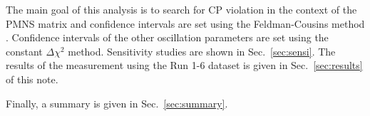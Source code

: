 The main goal of this analysis is to search for CP violation in the context of the PMNS matrix
and confidence intervals are set using the Feldman-Cousins method \cite{FeldmanCousins}.
Confidence intervals of the other oscillation parameters are set using the 
constant $\Delta \chi^2$ method.
Sensitivity studies are shown in Sec.~\ref{sec:sensi}.
The results of the measurement using the Run 1-6 dataset is given in Sec.~\ref{sec:results} of this note. 


Finally, a summary is given in Sec.~\ref{sec:summary}.  

\clearpage
